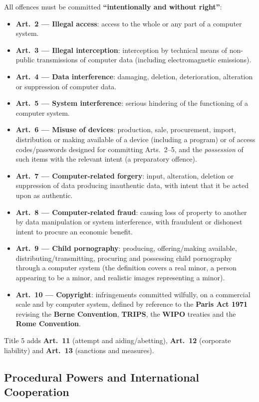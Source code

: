 \documentclass[11pt,a4paper,openany]{report}
\theoremstyle{definition}
\theoremstyle{plain}
\theoremstyle{remark}
\begin{document}
All offences must be committed \textbf{``intentionally and without right''}:
\begin{itemize}
    \item \textbf{Art.\ 2 --- Illegal access}: access to the whole or any part of a computer system.
    \item \textbf{Art.\ 3 --- Illegal interception}: interception by technical means of non-public transmissions of computer data (including electromagnetic emissions).
    \item \textbf{Art.\ 4 --- Data interference}: damaging, deletion, deterioration, alteration or suppression of computer data.
    \item \textbf{Art.\ 5 --- System interference}: serious hindering of the functioning of a computer system.
    \item \textbf{Art.\ 6 --- Misuse of devices}: production, sale, procurement, import, distribution or making available of a device (including a program) or of access codes/passwords designed for committing Arts.\ 2--5, and the \emph{possession} of such items with the relevant intent (a preparatory offence).
    \item \textbf{Art.\ 7 --- Computer-related forgery}: input, alteration, deletion or suppression of data producing inauthentic data, with intent that it be acted upon as authentic.
    \item \textbf{Art.\ 8 --- Computer-related fraud}: causing loss of property to another by data manipulation or system interference, with fraudulent or dishonest intent to procure an economic benefit.
    \item \textbf{Art.\ 9 --- Child pornography}: producing, offering/making available, distributing/transmitting, procuring and possessing child pornography through a computer system (the definition covers a real minor, a person appearing to be a minor, and realistic images representing a minor).
    \item \textbf{Art.\ 10 --- Copyright}: infringements committed wilfully, on a commercial scale and by computer system, defined by reference to the \textbf{Paris Act 1971} revising the \textbf{Berne Convention}, \textbf{TRIPS}, the \textbf{WIPO} treaties and the \textbf{Rome Convention}.
\end{itemize}
Title 5 adds \textbf{Art.\ 11} (attempt and aiding/abetting), \textbf{Art.\ 12} (corporate liability) and \textbf{Art.\ 13} (sanctions and measures).

\subsection{Procedural Powers and International Cooperation}
\end{document}
